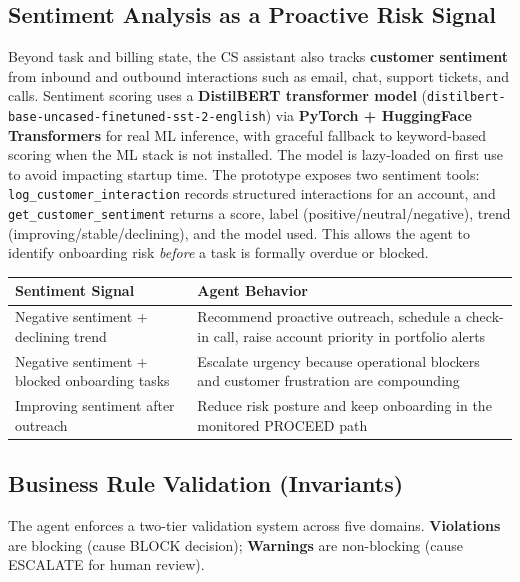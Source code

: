 \documentclass[8pt,a4paper]{article}
\begin{document}
\subsection{Sentiment Analysis as a Proactive Risk Signal}
{\scriptsize
Beyond task and billing state, the CS assistant also tracks \textbf{customer sentiment} from inbound and outbound interactions such as email, chat, support tickets, and calls. Sentiment scoring uses a \textbf{DistilBERT transformer model} (\texttt{distilbert-base-uncased-finetuned-sst-2-english}) via \textbf{PyTorch + HuggingFace Transformers} for real ML inference, with graceful fallback to keyword-based scoring when the ML stack is not installed. The model is lazy-loaded on first use to avoid impacting startup time. The prototype exposes two sentiment tools: \texttt{log\_customer\_interaction} records structured interactions for an account, and \texttt{get\_customer\_sentiment} returns a score, label (positive/neutral/negative), trend (improving/stable/declining), and the model used. This allows the agent to identify onboarding risk \emph{before} a task is formally overdue or blocked.
}

\vspace{0.08em}
\begin{table}[H]
\scriptsize
\begin{tabularx}{\textwidth}{@{}lX@{}}
\toprule
\textbf{Sentiment Signal} & \textbf{Agent Behavior} \\
\midrule
Negative sentiment + declining trend & Recommend proactive outreach, schedule a check-in call, raise account priority in portfolio alerts \\
Negative sentiment + blocked onboarding tasks & Escalate urgency because operational blockers and customer frustration are compounding \\
Improving sentiment after outreach & Reduce risk posture and keep onboarding in the monitored PROCEED path \\
\bottomrule
\end{tabularx}
\end{table}

\vspace{0.1em}
\subsection{Business Rule Validation (Invariants)}
{\scriptsize
The agent enforces a two-tier validation system across five domains. \textbf{Violations} are blocking (cause BLOCK decision); \textbf{Warnings} are non-blocking (cause ESCALATE for human review).
}
\end{document}
